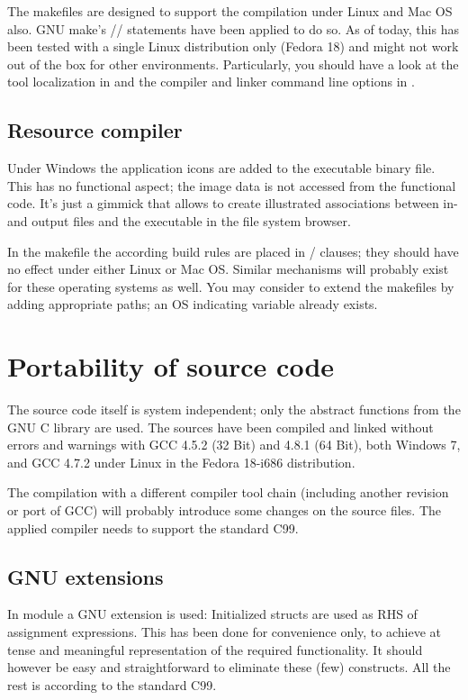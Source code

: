 The makefiles are designed to support the compilation under Linux and Mac
OS also. GNU make's // statements have
been applied to do so. As of today, this has been tested with a single Linux
distribution only (Fedora 18) and might not work out of the box for other
environments. Particularly, you should have a look at the tool
localization in  and the compiler and linker command
line options in .


\subsection{Resource compiler}

Under Windows the application icons are added to the executable binary
file. This has no functional aspect; the image data is not accessed from
the functional code. It's just a gimmick that allows to create illustrated
associations between \linnet{} in- and output files and the executable in
the file system browser.

In the makefile the according build rules are placed in
/ clauses; they should have no effect under either
Linux or Mac OS. Similar mechanisms will probably exist for these operating
systems as well. You may consider to extend the makefiles by adding
appropriate  paths; an OS indicating variable already exists.


\section{Portability of source code}

The source code itself is system independent; only the abstract functions
from the GNU C library are used. The sources have been compiled and linked
without errors and warnings with GCC 4.5.2 (32 Bit) and 4.8.1 (64 Bit),
both Windows 7, and GCC 4.7.2 under Linux in the Fedora 18-i686
distribution.

The compilation with a different compiler tool chain (including another
revision or port of GCC) will probably introduce some changes on the
source files. The applied compiler needs to support the standard C99.


\subsection{GNU extensions}

In module  a GNU extension is used: Initialized
structs are used as RHS of assignment expressions. This has been done
for convenience only, to achieve at tense and meaningful representation of
the required functionality. It should however be easy and straightforward
to eliminate these (few) constructs. All the rest is according to the
standard C99.


